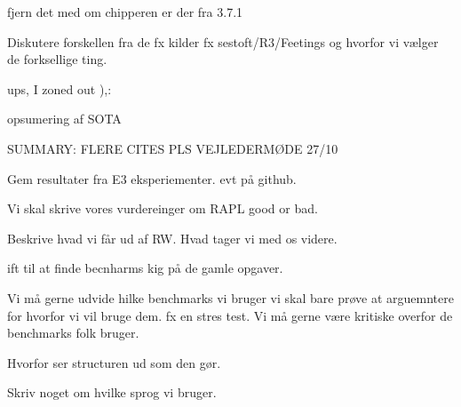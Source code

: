 
fjern det med om chipperen er der fra 3.7.1



Diskutere forskellen fra de fx kilder fx sestoft/R3/Feetings og hvorfor vi vælger de forksellige ting. 

ups, I zoned out ),:

opsumering af SOTA 

SUMMARY: FLERE CITES PLS
VEJLEDERMØDE 27/10



Gem resultater fra E3 eksperiementer. evt på github.



Vi skal skrive vores vurdereinger om RAPL good or bad. 

Beskrive hvad vi får ud af RW. Hvad tager vi med os videre.

ift til at finde becnharms kig på de gamle opgaver. 

Vi må gerne udvide hilke benchmarks vi bruger vi skal bare prøve at arguemntere for hvorfor vi vil bruge dem. fx en stres test. Vi må gerne være kritiske overfor de benchmarks folk bruger.



Hvorfor ser structuren ud som den gør.

Skriv noget om hvilke sprog vi bruger. 


